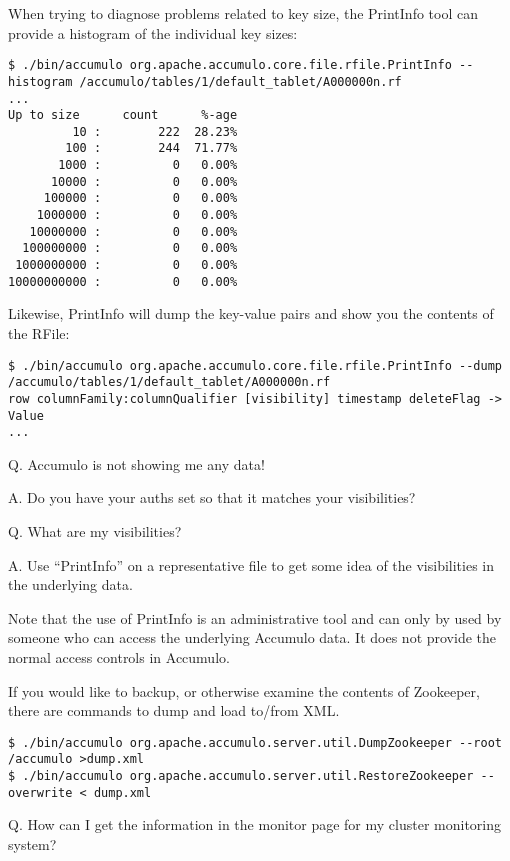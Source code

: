 When trying to diagnose problems related to key size, the PrintInfo tool can provide a histogram of the individual key sizes:

\begingroup\fontsize{8pt}{8pt}\selectfont\begin{verbatim}
$ ./bin/accumulo org.apache.accumulo.core.file.rfile.PrintInfo --histogram /accumulo/tables/1/default_tablet/A000000n.rf
...
Up to size      count      %-age
         10 :        222  28.23%
        100 :        244  71.77%
       1000 :          0   0.00%
      10000 :          0   0.00%
     100000 :          0   0.00%
    1000000 :          0   0.00%
   10000000 :          0   0.00%
  100000000 :          0   0.00%
 1000000000 :          0   0.00%
10000000000 :          0   0.00%
\end{verbatim}\endgroup

Likewise, PrintInfo will dump the key-value pairs and show you the contents of the RFile:

\begingroup\fontsize{8pt}{8pt}\selectfont\begin{verbatim}
$ ./bin/accumulo org.apache.accumulo.core.file.rfile.PrintInfo --dump /accumulo/tables/1/default_tablet/A000000n.rf
row columnFamily:columnQualifier [visibility] timestamp deleteFlag -> Value
...
\end{verbatim}\endgroup

Q. Accumulo is not showing me any data!

A. Do you have your auths set so that it matches your visibilities?

Q. What are my visibilities?

A. Use ``PrintInfo'' on a representative file to get some idea of the visibilities in the underlying data.

Note that the use of PrintInfo is an administrative tool and can only
by used by someone who can access the underlying Accumulo data. It
does not provide the normal access controls in Accumulo.

If you would like to backup, or otherwise examine the contents of Zookeeper, there are commands to dump and load to/from XML.

\begingroup\fontsize{8pt}{8pt}\selectfont\begin{verbatim}
$ ./bin/accumulo org.apache.accumulo.server.util.DumpZookeeper --root /accumulo >dump.xml
$ ./bin/accumulo org.apache.accumulo.server.util.RestoreZookeeper --overwrite < dump.xml
\end{verbatim}\endgroup

Q. How can I get the information in the monitor page for my cluster monitoring system?

